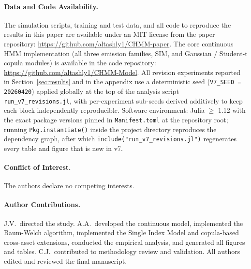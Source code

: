 \paragraph{Data and Code Availability.}
The simulation scripts, training and test data, and all code to reproduce the results in this paper are available under an MIT license from the paper repository: \url{https://github.com/altashly1/CHMM-paper}.
The core continuous HMM implementation (all three emission families, SIM, and Gaussian / Student-t copula modules) is available in the code repository: \url{https://github.com/altashly1/CHMM-Model}.
All revision experiments reported in Section~\ref{sec:results} and in the appendix use a deterministic seed (\texttt{V7\_SEED = 20260420}) applied globally at the top of the analysis script \texttt{run\_v7\_revisions.jl}, with per-experiment sub-seeds derived additively to keep each block independently reproducible.
Software environment: Julia \(\geq\) 1.12 with the exact package versions pinned in \texttt{Manifest.toml} at the repository root; running \texttt{Pkg.instantiate()} inside the project directory reproduces the dependency graph, after which \texttt{include("run\_v7\_revisions.jl")} regenerates every table and figure that is new in v7.

\paragraph{Conflict of Interest.}
The authors declare no competing interests.

\paragraph{Author Contributions.}
J.V.\ directed the study.
A.A.\ developed the continuous model, implemented the Baum-Welch algorithm, implemented the Single Index Model and copula-based cross-asset extensions, conducted the empirical analysis, and generated all figures and tables.
C.J.\ contributed to methodology review and validation.
All authors edited and reviewed the final manuscript.
